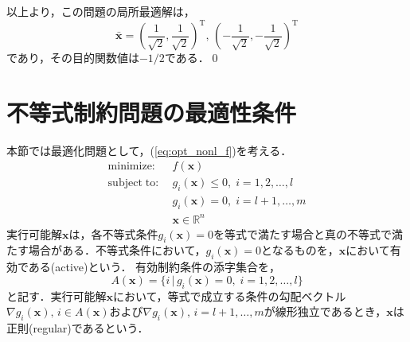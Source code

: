 \documentclass{jsreport}
\begin{document}
以上より，この問題の局所最適解は，
\begin{equation}
  \bar{\bm{x}} = \left(\frac{1}{\sqrt{2}}, \frac{1}{\sqrt{2}}\right)^{\mathrm{T}}, \, \left(- \frac{1}{\sqrt{2}}, - \frac{1}{\sqrt{2}}\right)^{\mathrm{T}} \nonumber
\end{equation}
であり，その目的関数値は$-1/2$である．\qed

\section{不等式制約問題の最適性条件}
本節では最適化問題として，(\ref{eq:opt_nonl_f})を考える．
\begin{align}\label{eq:opt_nonl_f}
  \mathrm{minimize} : \; &f(\bm{x}) \nonumber\\
  \mathrm{subject \; to} : \; &g_i(\bm{x}) \leq 0, \; i = 1, 2, \ldots, l \nonumber \\
  &g_i(\bm{x}) = 0, \; i = l+1, \ldots, m \nonumber \\
  &\bm{x} \in \mathbb{R}^n
\end{align}
実行可能解$\bm{x}$は，各不等式条件$g_i(\bm{x}) = 0$を等式で満たす場合と真の不等式で満たす場合がある．不等式条件において，$g_i(\bm{x}) = 0$となるものを，$\bm{x}$において有効である(active)という．
有効制約条件の添字集合を，
\begin{equation}\label{eq:activesubscript}
  A(\bm{x}) = \{i \, | \, g_i(\bm{x}) = 0, \; i = 1, 2, \ldots, l\}
\end{equation}
と記す．実行可能解$\bm{x}$において，等式で成立する条件の勾配ベクトル$\nabla g_i(\bm{x}), \, i \in A(\bm{x})$および$\nabla g_i(\bm{x}), \, i = l + 1, \ldots, m$が線形独立であるとき，$\bm{x}$は正則(regular)であるという．
\end{document}
